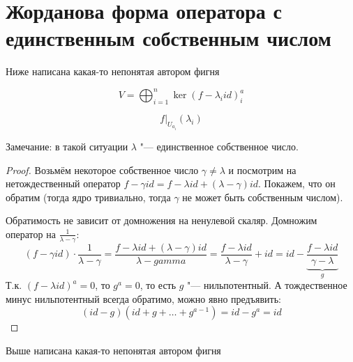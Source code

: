 \section{Жорданова форма оператора с единственным собственным числом}

\begin{center}
	{\color{red}\Large Ниже написана какая-то непонятая автором фигня}
\end{center}
 
\[ V = \bigoplus_{i=1}^n \ker (f - \lambda_i id)^a_i \]
 
\[ f\biggr|_{U_{a_i}}(\lambda_i) \]

Замечание: в такой ситуации $\lambda$ "--- единственное собственное число.
\begin{proof}
	Возьмём некоторое собственное число $\gamma \neq \lambda$
	и посмотрим на нетождественный оператор $f - \gamma id = f - \lambda id + (\lambda - \gamma) id$.
	Покажем, что он обратим (тогда ядро тривиально, тогда $\gamma$ не может быть собственным числом).

	Обратимость не зависит от домножения на ненулевой скаляр.
	Домножим оператор на $\frac{1}{\lambda - \gamma}$:
	\[
	(f - \gamma id) \cdot \frac{1}{\lambda - \gamma}
	=
	\frac{f - \lambda id + (\lambda - \gamma) id}{\lambda - gamma}
	=
	\frac{f - \lambda id}{\lambda - \gamma} + id
	=
	id - \underbrace{\frac{f - \lambda id}{\gamma - \lambda}}_{g}
	\]
	Т.к. $(f-\lambda id)^a = 0$, то $g^a = 0$, то есть $g$ "--- нильпотентный.
	А тождественное минус нильпотентный всегда обратимо, можно явно предъявить:
	\[
	(id - g)(id + g + \dots + g^{a-1}) = id - g^a = id
	\]
\end{proof}

\begin{center}
	{\color{red}\Large Выше написана какая-то непонятая автором фигня}
\end{center}

